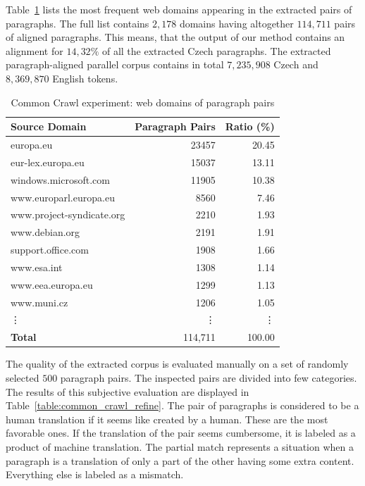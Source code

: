 Table~\ref{table:common_crawl_domains} lists the most frequent web domains appearing in the extracted pairs of paragraphs. The full list contains $2,178$ domains having altogether $114,711$ pairs of aligned paragraphs. This means, that the output of our method contains an alignment for $14,32\%$ of all the extracted Czech paragraphs. The extracted paragraph-aligned parallel corpus contains in total $7,235,908$ Czech and $8,369,870$ English tokens.

\begin{table}[!htb]
	\centering
	\caption{Common Crawl experiment: web domains of paragraph pairs}
	\label{table:common_crawl_domains}
	\vspace{1em}
	\begin{tabular}{|l|r|r|}
		\hline
		\textbf{Source Domain} & \textbf{Paragraph Pairs} & \textbf{Ratio (\%)} \\
		\hline
		europa.eu & 23457 & 20.45 \\
		eur-lex.europa.eu & 15037 & 13.11 \\
		windows.microsoft.com & 11905 & 10.38 \\
		www.europarl.europa.eu & 8560 & 7.46 \\
		www.project-syndicate.org & 2210 & 1.93 \\
		www.debian.org & 2191 & 1.91 \\
		support.office.com & 1908 & 1.66 \\
		www.esa.int & 1308 & 1.14 \\
		www.eea.europa.eu & 1299 & 1.13 \\
		www.muni.cz & 1206 & 1.05 \\
		\vdots & \vdots & \vdots  \\
		\hline
		\textbf{Total} & 114,711 & 100.00 \\
		\hline
	\end{tabular}
\end{table}

The quality of the extracted corpus is evaluated manually on a set of randomly selected $500$ paragraph pairs. The inspected pairs are divided into few categories. The results of this subjective evaluation are displayed in Table~\ref{table:common_crawl_refine}. The pair of paragraphs is considered to be a human translation if it seems like created by a human. These are the most favorable ones. If the translation of the pair seems cumbersome, it is labeled as a product of machine translation. The partial match represents a situation when a paragraph is a translation of only a part of the other having some extra content. Everything else is labeled as a mismatch.

